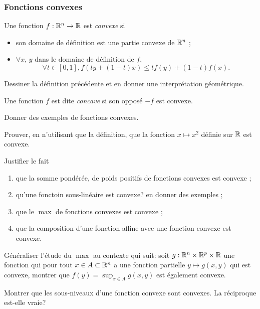\documentclass[11pt, a4paper]{article}
\begin{document}
\subsubsection{Fonctions convexes}
\label{sec:fonctionsconvexe}

\begin{defn}
  Une fonction $f : \mathbb{R}^n \to \mathbb{R}$ est \emph{convexe} si
  \begin{itemize}
  \item son domaine de définition est une partie convexe de $\mathbb{R}^n$ ;
  \item $\forall x$, $y$ dans le domaine de définition de $f$,
    \[
      \forall t \in [0, 1], f(ty + (1-t)x) \leq tf(y) + (1-t)f(x).
    \]
  \end{itemize}
\end{defn}
\begin{question}
  Dessiner la définition précédente et en donner une interprétation
  géométrique.
\end{question}
\begin{defn}
  Une fonction $f$ est dite \emph{concave} si son opposé $-f$ est
  convexe.
\end{defn}
\begin{question}
  Donner des exemples de fonctions convexes.
\end{question}
\begin{question}
  Prouver, en n'utilisant que la définition, que la fonction
  $x \mapsto x^2$ définie sur $\mathbb{R}$ est convexe.
\end{question}
\begin{question}
  Justifier le fait
  \begin{enumerate}
  \item que la somme pondérée, de poids positifs de fonctions convexes est convexe ;
  \item qu'une fonctoin sous-linéaire est convexe? en donner des exemples ;
  \item que le $\max$ de fonctions convexes est convexe ;
  \item que la composition d'une fonction affine avec une fonction
    convexe est convexe.
  \end{enumerate}
\end{question}
\begin{question}
  Généraliser l'étude du $\max$ au contexte qui suit: soit
  $g : \mathbb{R}^n \times \mathbb{R}^p \times \mathbb{R}$ une fonction qui pour tout
  $x \in A \subset \mathbb{R}^n$ a une fonction partielle $y \mapsto g(x, y)$
  qui est convexe, montrer que $f(y) = \sup_{x \in A} g(x, y)$ est
  également convexe.
\end{question}
\begin{question}
  Montrer que les sous-niveaux d'une fonction convexe sont
  convexes. La réciproque est-elle vraie?
\end{question}
\end{document}
